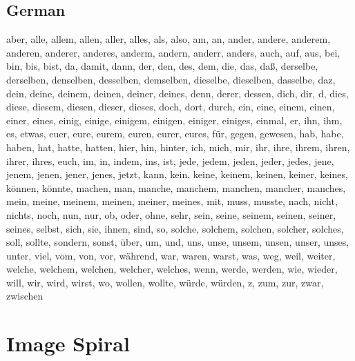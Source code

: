 \subsection{German}

aber, alle, allem, allen, aller, alles, als, also, am, an, ander, andere, anderem, anderen, anderer, anderes, anderm, andern, anderr, anders, auch, auf, aus, bei, bin, bis, bist, da, damit, dann, der, den, des, dem, die, das, da{\ss}, derselbe, derselben, denselben, desselben, demselben, dieselbe, dieselben, dasselbe, daz, dein, deine, deinem, deinen, deiner, deines, denn, derer, dessen, dich, dir, d, dies, diese, diesem, diesen, dieser, dieses, doch, dort, durch, ein, eine, einem, einen, einer, eines, einig, einige, einigem, einigen, einiger, einiges, einmal, er, ihn, ihm, es, etwas, euer, eure, eurem, euren, eurer, eures, f{\"u}r, gegen, gewesen, hab, habe, haben, hat, hatte, hatten, hier, hin, hinter, ich, mich, mir, ihr, ihre, ihrem, ihren, ihrer, ihres, euch, im, in, indem, ins, ist, jede, jedem, jeden, jeder, jedes, jene, jenem, jenen, jener, jenes, jetzt, kann, kein, keine, keinem, keinen, keiner, keines, k{\"o}nnen, k{\"o}nnte, machen, man, manche, manchem, manchen, mancher, manches, mein, meine, meinem, meinen, meiner, meines, mit, muss, musste, nach, nicht, nichts, noch, nun, nur, ob, oder, ohne, sehr, sein, seine, seinem, seinen, seiner, seines, selbst, sich, sie, ihnen, sind, so, solche, solchem, solchen, solcher, solches, soll, sollte, sondern, sonst, {\"u}ber, um, und, uns, unse, unsem, unsen, unser, unses, unter, viel, vom, von, vor, w{\"a}hrend, war, waren, warst, was, weg, weil, weiter, welche, welchem, welchen, welcher, welches, wenn, werde, werden, wie, wieder, will, wir, wird, wirst, wo, wollen, wollte, w{\"u}rde, w{\"u}rden, z, zum, zur, zwar, zwischen


\section{Image Spiral}
\label{s:imgspiral}

